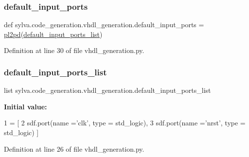 \subsubsection{\texorpdfstring{default\+\_\+input\+\_\+ports}{default\_input\_ports}}
{\footnotesize\ttfamily def sylva.\+code\+\_\+generation.\+vhdl\+\_\+generation.\+default\+\_\+input\+\_\+ports = \hyperlink{namespacesylva_1_1code__generation_1_1vhdl__generation_a10ea31d6ea98aa308e635b9403f5721f}{pl2pd}(\hyperlink{namespacesylva_1_1code__generation_1_1vhdl__generation_a2373c5e8bd084e84746b1b6b947a2667}{default\+\_\+input\+\_\+ports\+\_\+list})}



Definition at line 30 of file vhdl\+\_\+generation.\+py.

\mbox{\label{namespacesylva_1_1code__generation_1_1vhdl__generation_a2373c5e8bd084e84746b1b6b947a2667}} 
\subsubsection{\texorpdfstring{default\+\_\+input\+\_\+ports\+\_\+list}{default\_input\_ports\_list}}
{\footnotesize\ttfamily list sylva.\+code\+\_\+generation.\+vhdl\+\_\+generation.\+default\+\_\+input\+\_\+ports\+\_\+list}

{\bfseries Initial value\+:}
\begin{DoxyCode}
1 =  [
2   sdf.port(name =\textcolor{stringliteral}{'clk'}, type = std\_logic),
3   sdf.port(name =\textcolor{stringliteral}{'nrst'}, type = std\_logic) ]
\end{DoxyCode}


Definition at line 26 of file vhdl\+\_\+generation.\+py.

\mbox{\label{namespacesylva_1_1code__generation_1_1vhdl__generation_a10ea31d6ea98aa308e635b9403f5721f}} 
